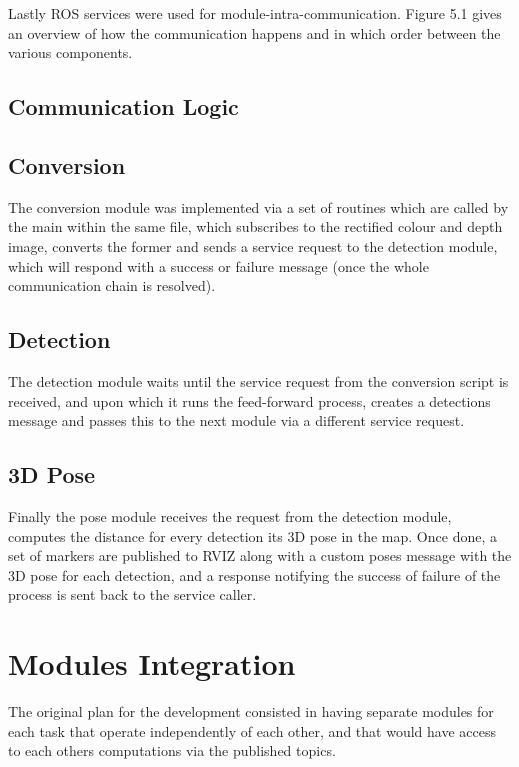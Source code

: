 Lastly ROS services were used for module-intra-communication. Figure 5.1 gives an overview of how the communication happens and in which order between the various components.

\subsection{Communication Logic}

\subsection{Conversion}

The conversion module was implemented via a set of routines which are called by the main within the same file, which subscribes to the rectified colour and depth image, converts the former and sends a service request to the detection module, which will respond with a success or failure message (once the whole communication chain is resolved).

\subsection{Detection}

The detection module waits until the service request from the conversion script is received, and upon which it runs the feed-forward process, creates a detections message and passes this to the next module via a different service request.

\subsection{3D Pose}

Finally the pose module receives the request from the detection module, computes the distance for every detection its 3D pose in the map. Once done, a set of markers are published to RVIZ along with a custom poses message with the 3D pose for each detection, and a response notifying the success of failure of the process is sent back to the service caller.

\section{Modules Integration}

The original plan for the development consisted in having separate modules for each task that operate independently of each other, and that would have access to each others computations via the published topics. 

